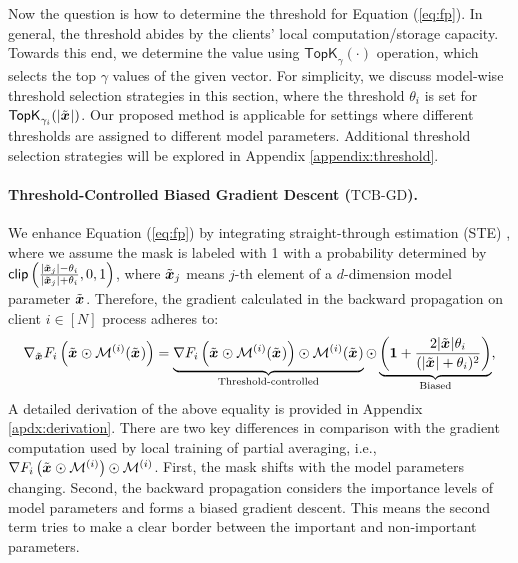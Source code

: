 \documentclass{article}
\renewcommand{\cite}{\citep}
\theoremstyle{plain}
\theoremstyle{definition}
\theoremstyle{remark}
\newcommand{\module}{\ensuremath{\text{TCB-GD}}\xspace}
\renewcommand{\eqref}[1]{Equation (\ref{#1})}
\newcommand{\bracket}[1]{\left(#1\right)}
\begin{document}
Now the question is how to determine the threshold for \eqref{eq:fp}. In general, the threshold abides by the clients' local computation/storage capacity. Towards this end, we determine the value using $\textsf{TopK}_{\gamma}(\cdot)$ operation, which selects the top $\gamma$ values of the given vector. For simplicity, we discuss model-wise threshold selection strategies in this section, where the threshold $\theta_i$ is set for $\textsf{TopK}_{\gamma_i}(|\x{}|)$. Our proposed method is applicable for settings where different thresholds are assigned to different model parameters. Additional threshold selection strategies will be explored in Appendix \ref{appendix:threshold}.

\paragraph{Threshold-Controlled Biased Gradient Descent (\module).} 

We enhance \eqref{eq:fp} by integrating straight-through estimation (STE) \cite{bengio2013estimating, liu2022nonuniform}, where we assume the mask is labeled with 1 with a probability determined by $\textsf{clip}\left(\frac{|\x{j}| - \theta_i}{|\x{j}| + \theta_i}, 0, 1\right)$, where $\x{j}$ means $j$-th element of a $d$-dimension model parameter $\x{}$. Therefore, the gradient calculated in the backward propagation on client $i \in [N]$ process adheres to:
\begin{equation} \label{eq:bp}
    \nabla_{\x{}} F_i\bracket{\x{} \odot \mask{i}(\x{})} = \underbrace{\nabla F_i\bracket{\x{} \odot \mask{i}(\x{})} \odot \mask{i}(\x{})}_{\text{Threshold-controlled}} \odot \underbrace{\left(\boldsymbol{1} + \frac{2 |\x{}| \theta_i}{(|\x{}| + \theta_i)^2}\right)}_{\text{Biased}},
\end{equation}
A detailed derivation of the above equality is provided in Appendix \ref{apdx:derivation}. There are two key differences in comparison with the gradient computation used by local training of partial averaging, i.e., $\nabla F_i\bracket{\x{} \odot \mask{i}}\odot \mask{i}$. First, the mask shifts with the model parameters changing. Second, the backward propagation considers the importance levels of model parameters and forms a biased gradient descent. This means the second term tries to make a clear border between the important and non-important parameters. 
\end{document}
